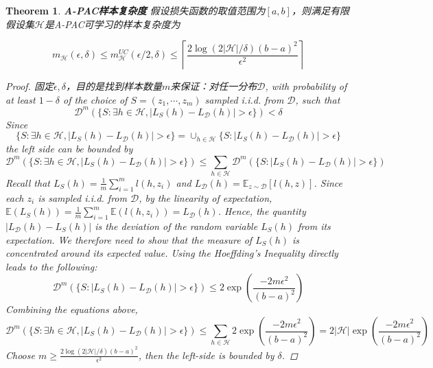 \documentclass{article}
\newtheorem{theorem}{Theorem}
\newtheorem*{proof}{Proof}
\begin{document}
	\begin{theorem}
	\textbf{A-PAC样本复杂度} 假设损失函数的取值范围为$[a,b]$，则满足有限假设集$\mathcal{H}$是A-PAC可学习的样本复杂度为
	
	\begin{equation}
	m_\mathcal{H}(\epsilon,\delta)\leq m^{UC}_\mathcal{H}(\epsilon/2,\delta)\leq\left\lceil\frac{2\log(2|\mathcal{H}|/\delta)(b-a)^2}{\epsilon^2}\right\rceil
	\end{equation}
	
	\begin{proof}
	固定$\epsilon,\delta$，目的是找到样本数量$m$来保证：对任一分布$\mathcal{D}$, with probability of at least $1-\delta$ of the choice of $S=(z_1,\cdots,z_m)$ sampled i.i.d. from $\mathcal{D}$, such that
	\begin{equation*}
	\mathcal{D}^m(\{S:\exists h\in\mathcal{H}, |L_S(h)-L_\mathcal{D}(h)|>\epsilon\}) < \delta
	\end{equation*}
	Since
	\begin{equation*}
	\{S:\exists h\in\mathcal{H}, |L_S(h)-L_\mathcal{D}(h)|>\epsilon\} = \cup_{h\in\mathcal{H}}\{S:|L_S(h)-L_\mathcal{D}(h)|>\epsilon\}
	\end{equation*}
the left side can be bounded by
	\begin{equation*}
	\mathcal{D}^m(\{S:\exists h\in\mathcal{H}, |L_S(h)-L_\mathcal{D}(h)|>\epsilon\}) \leq \sum_{h\in\mathcal{H}} \mathcal{D}^m(\{S:|L_S(h)-L_\mathcal{D}(h)|>\epsilon\})
	\end{equation*}
	Recall that $L_S(h)=\frac{1}{m}\sum_{i=1}^m l(h,z_i)$ and $L_\mathcal{D}(h)=\mathbb{E}_{z\sim\mathcal{D}}[l(h,z)]$. Since each $z_i$ is sampled i.i.d. from $\mathcal{D}$, by the linearity of expectation, $\mathbb{E}(L_S(h))=\frac{1}{m}\sum_{i=1}^m \mathbb{E}(l(h,z_i))=L_\mathcal{D}(h)$. Hence, the quantity $|L_\mathcal{D}(h)-L_S(h)|$ is the deviation of the random variable $L_S(h)$ from its expectation. We therefore need to show that the measure of $L_S(h)$ is concentrated around its expected value. Using the Hoeffding's Inequality directly leads to the following:
	\begin{equation*}
	\mathcal{D}^m(\{S:|L_S(h)-L_\mathcal{D}(h)|>\epsilon\}) \leq 2 \exp \left( \frac{-2m\epsilon^2 }{(b-a)^2} \right)
	\end{equation*}
	Combining the equations above,
	\begin{equation*}
	\mathcal{D}^m(\{S:\exists h\in\mathcal{H}, |L_S(h)-L_\mathcal{D}(h)|>\epsilon\}) \leq \sum_{h\in\mathcal{H}} 2 \exp \left( \frac{-2m\epsilon^2 }{(b-a)^2} \right) = 2|\mathcal{H}|\exp \left( \frac{-2m\epsilon^2 }{(b-a)^2} \right)
	\end{equation*}
	Choose $m\geq\frac{2\log(2|\mathcal{H}|/\delta)(b-a)^2}{\epsilon^2}$, then the left-side is bounded by $\delta$.
	\end{proof}	
	\end{theorem}
\end{document}
